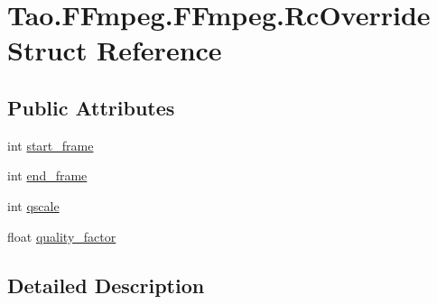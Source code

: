 \hypertarget{struct_tao_1_1_f_fmpeg_1_1_f_fmpeg_1_1_rc_override}{
\section{Tao.FFmpeg.FFmpeg.RcOverride Struct Reference}
\label{struct_tao_1_1_f_fmpeg_1_1_f_fmpeg_1_1_rc_override}
}
\subsection*{Public Attributes}
\begin{DoxyCompactItemize}
\item 
int \hyperlink{struct_tao_1_1_f_fmpeg_1_1_f_fmpeg_1_1_rc_override_a06796e4c21f178eb521f776eb3a15102}{start\_\-frame}
\item 
int \hyperlink{struct_tao_1_1_f_fmpeg_1_1_f_fmpeg_1_1_rc_override_a0250030ea6c42803b9d68776d444b181}{end\_\-frame}
\item 
int \hyperlink{struct_tao_1_1_f_fmpeg_1_1_f_fmpeg_1_1_rc_override_ac8f71b2b29a8fd62eef55476c3010c02}{qscale}
\item 
float \hyperlink{struct_tao_1_1_f_fmpeg_1_1_f_fmpeg_1_1_rc_override_a7fa5205113564e69f82aaf10ebb01a77}{quality\_\-factor}
\end{DoxyCompactItemize}


\subsection{Detailed Description}


